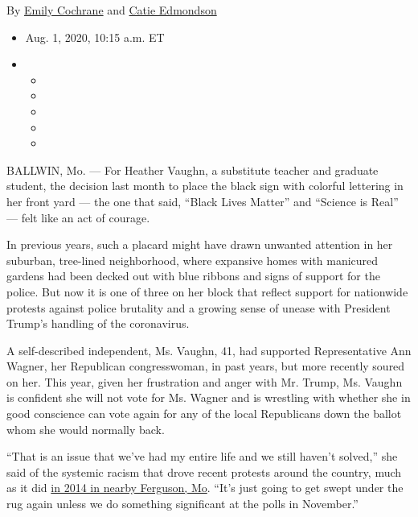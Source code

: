 By \href{https://www.nytimes3xbfgragh.onion/by/emily-cochrane}{Emily
Cochrane} and
\href{https://www.nytimes3xbfgragh.onion/by/catie-edmondson}{Catie
Edmondson}

\begin{itemize}
\item
  Aug. 1, 2020, 10:15 a.m. ET
\item
  \begin{itemize}
  \item
  \item
  \item
  \item
  \item
  \end{itemize}
\end{itemize}

BALLWIN, Mo. --- For Heather Vaughn, a substitute teacher and graduate
student, the decision last month to place the black sign with colorful
lettering in her front yard --- the one that said, ``Black Lives
Matter'' and ``Science is Real'' --- felt like an act of courage.

In previous years, such a placard might have drawn unwanted attention in
her suburban, tree-lined neighborhood, where expansive homes with
manicured gardens had been decked out with blue ribbons and signs of
support for the police. But now it is one of three on her block that
reflect support for nationwide protests against police brutality and a
growing sense of unease with President Trump's handling of the
coronavirus.

A self-described independent, Ms. Vaughn, 41, had supported
Representative Ann Wagner, her Republican congresswoman, in past years,
but more recently soured on her. This year, given her frustration and
anger with Mr. Trump, Ms. Vaughn is confident she will not vote for Ms.
Wagner and is wrestling with whether she in good conscience can vote
again for any of the local Republicans down the ballot whom she would
normally back.

``That is an issue that we've had my entire life and we still haven't
solved,'' she said of the systemic racism that drove recent protests
around the country, much as it did
\href{https://www.nytimes3xbfgragh.onion/interactive/2014/08/13/us/ferguson-missouri-town-under-siege-after-police-shooting.html}{in
2014 in nearby Ferguson, Mo}. ``It's just going to get swept under the
rug again unless we do something significant at the polls in November.''

